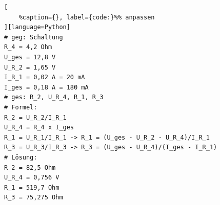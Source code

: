 \lstset{language=Python}%
\begin{lstlisting}[
	%caption={}, label={code:}%% anpassen
][language=Python]
# geg: Schaltung
R_4 = 4,2 Ohm
U_ges = 12,8 V
U_R_2 = 1,65 V
I_R_1 = 0,02 A = 20 mA
I_ges = 0,18 A = 180 mA
# ges: R_2, U_R_4, R_1, R_3
# Formel:
R_2 = U_R_2/I_R_1
U_R_4 = R_4 x I_ges
R_1 = U_R_1/I_R_1 -> R_1 = (U_ges - U_R_2 - U_R_4)/I_R_1
R_3 = U_R_3/I_R_3 -> R_3 = (U_ges - U_R_4)/(I_ges - I_R_1)
# Lösung:
R_2 = 82,5 Ohm
U_R_4 = 0,756 V
R_1 = 519,7 Ohm
R_3 = 75,275 Ohm
\end{lstlisting}
